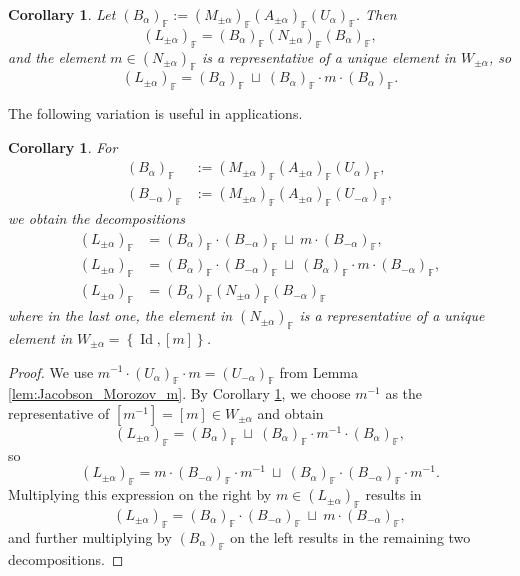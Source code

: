 \documentclass[12pt]{amsart}
\newcommand{\F}{\mathbb{F} }
\numberwithin{equation}{section}
\newtheorem{corollary}[theorem]{Corollary}
\theoremstyle{remark} %
\begin{document}
\begin{corollary}\label{cor:levi_Bruhat}
	Let $(B_{\alpha})_\F := (M_{\pm \alpha})_\F (A_{\pm \alpha})_\F (U_\alpha)_\F$. Then 
	$$
	(L_{\pm \alpha})_\F = (B_{\alpha})_\F (N_{\pm \alpha})_\F (B_{\alpha})_\F ,
	$$
	and the element $m \in (N_{\pm \alpha})_\F$ is a representative of a unique element in $W_{\pm \alpha}$, so
	$$
	(L_{\pm \alpha})_\F = (B_{\alpha})_\F \ \sqcup \   (B_{\alpha})_\F \cdot m \cdot (B_{ \alpha})_\F.
	$$
\end{corollary}
The following variation is useful in applications.
\begin{corollary}\label{cor:levi_Bruhat_alternative}
	For
	\begin{align*}
		(B_{\alpha})_\F &:= (M_{\pm \alpha})_\F (A_{\pm \alpha})_\F (U_\alpha)_\F, \\
		(B_{-\alpha})_\F &:= (M_{\pm \alpha})_\F (A_{\pm \alpha})_\F (U_{-\alpha})_\F,
	\end{align*} 
	we obtain the decompositions
	\begin{align*}
		(L_{\pm \alpha})_\F &=(B_{\alpha})_\F \cdot (B_{-\alpha})_\F  \ \sqcup \   m \cdot (B_{ -\alpha})_\F,  \\
		(L_{\pm \alpha})_\F &=(B_{\alpha})_\F \cdot (B_{-\alpha})_\F  \ \sqcup \   (B_{\alpha})_\F \cdot m \cdot (B_{ -\alpha})_\F,  \\
		(L_{\pm \alpha})_\F &= (B_{ \alpha})_\F (N_{\pm \alpha})_\F (B_{- \alpha})_\F 
	\end{align*}
where in the last one, the element in $(N_{\pm \alpha})_\F$ is a representative of a unique element in $W_{\pm \alpha} = \left\{ \operatorname{Id}, [m] \right\}$.
\end{corollary}
\begin{proof}
	We use $m^{-1} \cdot (U_\alpha)_\F\cdot  m = (U_{-\alpha})_\F$ from Lemma \ref{lem:Jacobson_Morozov_m}. By Corollary \ref{cor:levi_Bruhat}, we choose $m^{-1}$ as the representative of $[m^{-1}]=[m] \in W_{\pm \alpha} $ and obtain
	$$
	(L_{\pm \alpha})_\F = (B_{\alpha})_\F \ \sqcup \   (B_{\alpha})_\F \cdot m^{-1} \cdot (B_{ \alpha})_\F,
	$$
	so 
	$$
	(L_{\pm \alpha})_\F = m \cdot (B_{-\alpha})_\F \cdot m^{-1} \ \sqcup \   (B_{\alpha})_\F  \cdot (B_{ -\alpha})_\F \cdot m^{-1}.
	$$
	Multiplying this expression on the right by $m\in (L_{\pm \alpha})_\F$ results in
	$$
	(L_{\pm \alpha})_\F =(B_{\alpha})_\F \cdot (B_{-\alpha})_\F  \ \sqcup \   m \cdot (B_{ -\alpha})_\F, 
	$$ 
	and further multiplying by $(B_\alpha)_\F$ on the left results in the remaining two decompositions.
\end{proof}
\end{document}

